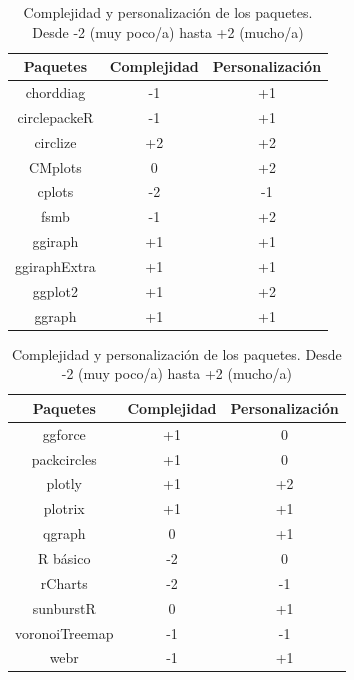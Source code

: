 \documentclass{article}\usepackage[]{graphicx}\usepackage[]{color}
\begin{document}
\begin{table}[h!]
\centering
\begin{tabular}{|c|c|c|} 
\hline
Paquetes & Complejidad & Personalizaci\'on\\
\hline
 chorddiag & -1 & +1\\%
\hline
circlepackeR & -1 & +1\\%
\hline
circlize & +2 & +2\\
\hline
CMplots & 0 & +2\\ %
\hline
cplots & -2 & -1\\ %
\hline
fsmb & -1 & +2\\ %
\hline
ggiraph & +1 & +1\\%
\hline
ggiraphExtra & +1 & +1\\%
\hline
ggplot2 & +1 & +2\\
\hline
ggraph & +1 & +1\\%
\hline
\end{tabular}
\begin{tabular}{|c|c|c|} 
\hline
Paquetes & Complejidad & Personalizaci\'on\\
\hline
ggforce & +1 & 0\\ %
\hline
packcircles & +1 & 0\\%
\hline
plotly & +1 & +2\\ %
\hline
plotrix & +1 & +1\\ %
\hline
qgraph & 0 & +1\\
\hline
R b\'asico & -2 & 0\\%
\hline
rCharts & -2 & -1\\%
\hline
sunburstR & 0 & +1\\%
\hline
voronoiTreemap & -1 & -1\\%
\hline
webr & -1 & +1\\%
\hline
\end{tabular}
\caption{Complejidad y personalizaci\'on de los paquetes. Desde -2 (muy poco/a) hasta +2 (mucho/a)}
\label{table:tabla4}
\end{table}
\clearpage
\end{document}
